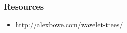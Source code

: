 \documentclass{beamer}
\begin{document}
\begin{frame}
\frametitle{Resources}
\begin{itemize}
  \item \url{http://alexbowe.com/wavelet-trees/}
\end{itemize}
\end{frame}
 
 


% 
% 
% 
% 
% 
\end{document}
